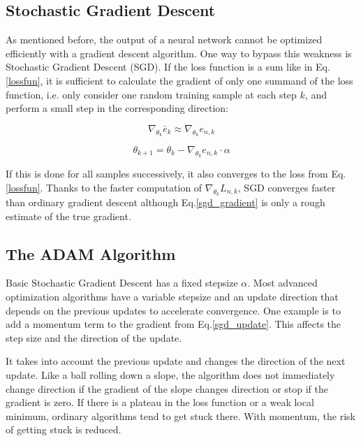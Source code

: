 \subsection{Stochastic Gradient Descent}
\label{sec:sgd}

As mentioned before, the output of a neural network cannot be optimized efficiently with a gradient descent algorithm. One way to bypass this weakness is Stochastic Gradient Descent (SGD). If the loss function is a sum like in Eq. \ref{lossfun}, it is sufficient to calculate the gradient of only one summand of the loss function, i.e. only consider one random training sample at each step $k$, and perform a small step in the corresponding direction:

\begin{equation}
\nabla_{\theta_k}\bar{e}_k \approx \nabla_{\theta_k}e_{n,k}
\label{sgd_gradient}
\end{equation}

\begin{equation}
\theta_{k+1} = \theta_k - \nabla_{\theta_k}e_{n,k} \cdot \alpha
\label{sgd_update}
\end{equation}

If this is done for all samples successively, it also converges to the loss from Eq.\ref{lossfun}. 
Thanks to the faster computation of $\nabla_{\theta_k}L_{n,k}$, SGD converges faster than ordinary gradient descent although Eq.\ref{sgd_gradient} is only a rough estimate of the true gradient.


\subsection{The ADAM Algorithm}
\label{sec:adam}

Basic Stochastic Gradient Descent has a fixed stepsize $\alpha$. Most advanced optimization algorithms have a variable stepsize and an update direction that depends on the previous updates to accelerate convergence. One example is to add a momentum term to the gradient from Eq.\ref{sgd_update}. This affects the step size and the direction of the update.

It takes into account the previous update and changes the direction of the next update. Like a ball rolling down a slope, the algorithm does not immediately change direction if the gradient of the slope changes direction or stop if the gradient is zero. If there is a plateau in the loss function or a weak local minimum, ordinary algorithms tend to get stuck there. With momentum, the risk of getting stuck is reduced.

